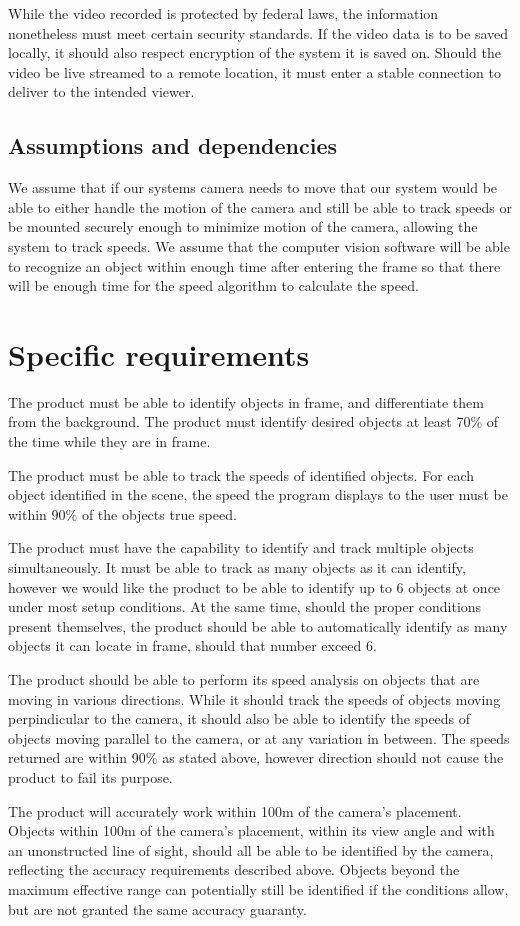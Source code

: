 \documentclass[letterpaper,10pt,onecolumn,draftclsnofoot]{IEEEtran}
\begin{document}
While the video recorded is protected by federal laws, the information nonetheless must meet certain security standards.
If the video data is to be saved locally, it should also respect encryption of the system it is saved on.
Should the video be live streamed to a remote location, it must enter a stable connection to deliver to the intended viewer.

\subsection{Assumptions and dependencies}
We assume that if our systems camera needs to move that our system would be able to either handle the motion of the camera and still be able to track speeds or be mounted securely enough to minimize motion of the camera, allowing the system to track speeds.
We assume that the computer vision software will be able to recognize an object within enough time after entering the frame so that there will be enough time for the speed algorithm to calculate the speed.

\section{Specific requirements}
The product must be able to identify objects in frame, and differentiate them from the background.
The product must identify desired objects at least 70\% of the time while they are in frame.

The product must be able to track the speeds of identified objects.
For each object identified in the scene, the speed the program displays to the user must be within 90\% of the objects true speed.

The product must have the capability to identify and track multiple objects simultaneously.
It must be able to track as many objects as it can identify, however we would like the product to be able to identify up to 6 objects at once under most setup conditions. 
At the same time, should the proper conditions present themselves, the product should be able to automatically identify as many objects it can locate in frame, should that number exceed 6.

The product should be able to perform its speed analysis on objects that are moving in various directions.
While it should track the speeds of objects moving perpindicular to the camera, it should also be able to identify the speeds of objects moving parallel to the camera, or at any variation in between.
The speeds returned are within 90\% as stated above, however direction should not cause the product to fail its purpose.

The product will accurately work within 100m of the camera's placement.
Objects within 100m of the camera's placement, within its view angle and with an unonstructed line of sight, should all be able to be identified by the camera, reflecting the accuracy requirements described above.
Objects beyond the maximum effective range can potentially still be identified if the conditions allow, but are not granted the same accuracy guaranty.
\end{document}
